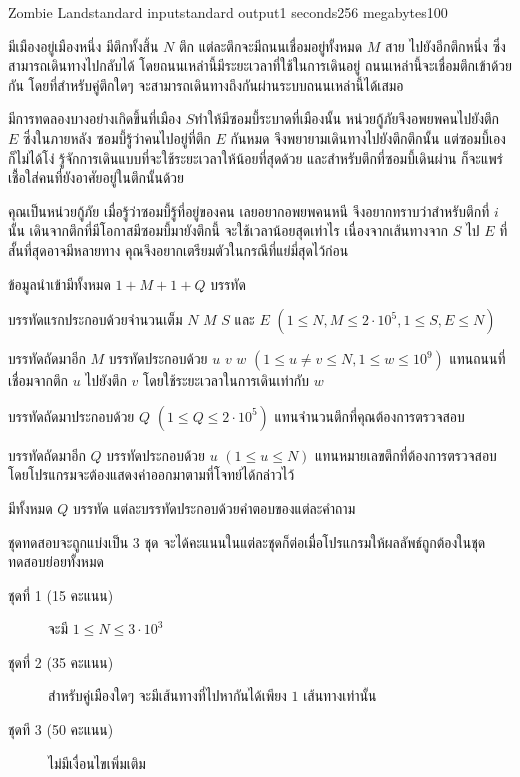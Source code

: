 \documentclass[11pt,a4paper]{article}
\begin{document}
\begin{problem}{Zombie Land}{standard input}{standard output}{1 seconds}{256 megabytes}{100}

มีเมืองอยู่เมืองหนึ่ง มีตึกทั้งสิ้น $N$ ตึก แต่ละตึกจะมีถนนเชื่อมอยู่ทั้งหมด $M$ สาย ไปยังอีกตึกหนึ่ง ซึ่งสามารถเดินทางไปกลับได้ โดยถนนเหล่านี้มีระยะเวลาที่ใช้ในการเดินอยู่ ถนนเหล่านี้จะเชื่อมตึกเข้าด้วยกัน โดยที่สำหรับคู่ตึกใดๆ จะสามารถเดินทางถึงกันผ่านระบบถนนเหล่านี้ได้เสมอ

มีการทดลองบางอย่างเกิดขึ้นที่เมือง $S$ทำให้มีซอมบี้ระบาดที่เมืองนั้น หน่วยกู้ภัยจึงอพยพคนไปยังตึก $E$ ซึ่งในภายหลัง ซอมบี้รู้ว่าคนไปอยู่ที่ตึก $E$ กันหมด จึงพยายามเดินทางไปยังตึกตึกนั้น แต่ซอมบี้เองก็ไม่ได้โง่ รู้จักการเดินแบบที่จะใช้ระยะเวลาให้น้อยที่สุดด้วย และสำหรับตึกที่ซอมบี้เดินผ่าน ก็จะแพร่เชื้อใส่คนที่ยังอาศัยอยู่ในตึกนั้นด้วย

คุณเป็นหน่วยกู้ภัย เมื่อรู้ว่าซอมบี้รู้ที่อยู่ของคน เลยอยากอพยพคนหนี จึงอยากทราบว่าสำหรับตึกที่ $i$ นั้น เดินจากตึกที่มีโอกาสมีซอมบี้มายังตึกนี้ จะใช้เวลาน้อยสุดเท่าไร เนื่องจากเส้นทางจาก $S$ ไป $E$ ที่สั้นที่สุดอาจมีหลายทาง คุณจึงอยากเตรียมตัวในกรณีที่แย่มี่สุดไว้ก่อน

\InputFile
ข้อมูลนำเข้ามีทั้งหมด $1 + M + 1 + Q$ บรรทัด

บรรทัดแรกประกอบด้วยจำนวนเต็ม $N$ $M$ $S$ และ $E$ $(1 \leq N, M \leq 2 \cdot 10^5, 1 \leq S, E \leq N)$ 

บรรทัดถัดมาอีก $M$ บรรทัดประกอบด้วย $u$ $v$ $w$ $(1 \leq u \neq v \leq N, 1 \leq w \leq 10^9)$ แทนถนนที่เชื่อมจากตึก $u$ ไปยังตึก $v$ โดยใช้ระยะเวลาในการเดินเท่ากับ $w$

บรรทัดถัดมาประกอบด้วย $Q$ $(1 \leq Q \leq 2 \cdot 10^5)$ แทนจำนวนตึกที่คุณต้องการตรวจสอบ

บรรทัดถัดมาอีก $Q$ บรรทัดประกอบด้วย $u$ $(1 \leq u \leq N)$ แทนหมายเลขตึกที่ต้องการตรวจสอบ โดยโปรแกรมจะต้องแสดงค่าออกมาตามที่โจทย์ได้กล่าวไว้

\OutputFile
มีทั้งหมด $Q$ บรรทัด แต่ละบรรทัดประกอบด้วยคำตอบของแต่ละคำถาม

\Scoring
ชุดทดสอบจะถูกแบ่งเป็น 3 ชุด จะได้คะแนนในแต่ละชุดก็ต่อเมื่อโปรแกรมให้ผลลัพธ์ถูกต้องในชุดทดสอบย่อยทั้งหมด

\begin{description}

\item[ชุดที่ 1 (15 คะแนน)] จะมี $ 1 \leq N \leq 3 \cdot 10^3 $

\item[ชุดที่ 2 (35 คะแนน)] สำหรับคู่เมืองใดๆ จะมีเส้นทางที่ไปหากันได้เพียง $1$ เส้นทางเท่านั้น

\item[ชุดที 3 (50 คะแนน)] ไม่มีเงื่อนไขเพิ่มเติม

\end{description}

\Examples

\begin{example}
\end{example}

\end{problem}
\end{document}
